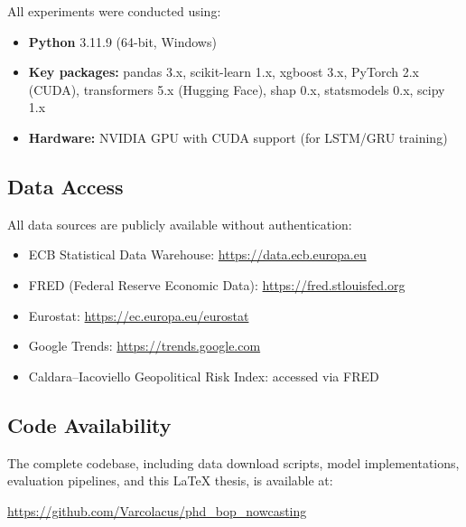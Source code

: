 All experiments were conducted using:
\begin{itemize}
  \item \textbf{Python} 3.11.9 (64-bit, Windows)
  \item \textbf{Key packages:} pandas 3.x, scikit-learn 1.x, xgboost 3.x, PyTorch 2.x (CUDA), transformers 5.x (Hugging Face), shap 0.x, statsmodels 0.x, scipy 1.x
  \item \textbf{Hardware:} NVIDIA GPU with CUDA support (for LSTM/GRU training)
\end{itemize}

\subsection{Data Access}

All data sources are publicly available without authentication:
\begin{itemize}
  \item ECB Statistical Data Warehouse: \url{https://data.ecb.europa.eu}
  \item FRED (Federal Reserve Economic Data): \url{https://fred.stlouisfed.org}
  \item Eurostat: \url{https://ec.europa.eu/eurostat}
  \item Google Trends: \url{https://trends.google.com}
  \item Caldara--Iacoviello Geopolitical Risk Index: accessed via FRED
\end{itemize}

\subsection{Code Availability}

The complete codebase, including data download scripts, model implementations, evaluation pipelines, and this LaTeX thesis, is available at:
\begin{center}
\url{https://github.com/Varcolacus/phd_bop_nowcasting}
\end{center}
